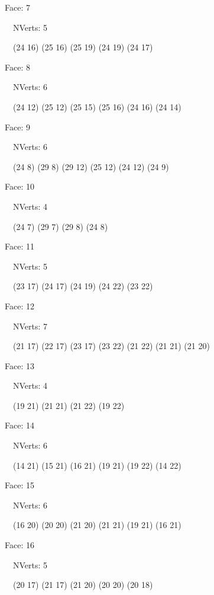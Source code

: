 \documentclass{article}
\begin{document}
{\footnotesize 

Face: 7

\   \    NVerts: 5

 \   \   (24 16) (25 16) (25 19) (24 19) (24 17)}

{\footnotesize 

Face: 8

\   \    NVerts: 6

 \   \   (24 12) (25 12) (25 15) (25 16) (24 16) (24 14)}

{\footnotesize 

Face: 9

\   \    NVerts: 6

 \   \   (24 8) (29 8) (29 12) (25 12) (24 12) (24 9)}

{\footnotesize 

Face: 10

\   \    NVerts: 4

 \   \   (24 7) (29 7) (29 8) (24 8)}

{\footnotesize 

Face: 11

\   \    NVerts: 5

 \   \   (23 17) (24 17) (24 19) (24 22) (23 22)}

{\footnotesize 

Face: 12

\   \    NVerts: 7

 \   \   (21 17) (22 17) (23 17) (23 22) (21 22) (21 21) (21 20)}

{\footnotesize 

Face: 13

\   \    NVerts: 4

 \   \   (19 21) (21 21) (21 22) (19 22)}

{\footnotesize 

Face: 14

\   \    NVerts: 6

 \   \   (14 21) (15 21) (16 21) (19 21) (19 22) (14 22)}

{\footnotesize 

Face: 15

\   \    NVerts: 6

 \   \   (16 20) (20 20) (21 20) (21 21) (19 21) (16 21)}

{\footnotesize 

Face: 16

\   \    NVerts: 5

 \   \   (20 17) (21 17) (21 20) (20 20) (20 18)}
\end{document}
